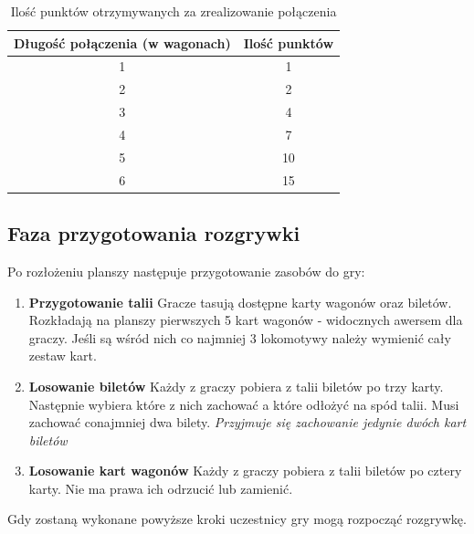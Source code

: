 \documentclass[12pt, oneside]{report}
\begin{document}
\begin{table}[h]
	\begin{center}
		\begin{tabular}{|c|c|} \hline
		\textbf{Długość połączenia} (w wagonach) & \textbf{Ilość punktów} \\ \hline
		1 & 1 \\ \hline
		2 & 2 \\ \hline
		3 & 4 \\ \hline
		4 & 7 \\ \hline
		5 & 10 \\ \hline
		6 & 15 \\ \hline
		\end{tabular}	
		\caption{Ilość punktów otrzymywanych za zrealizowanie połączenia}
		\label{table:points}
	\end{center}

\end{table}

\subsection{Faza przygotowania rozgrywki}
Po rozłożeniu planszy następuje przygotowanie zasobów do gry:
\begin{enumerate}
	\item \textbf{Przygotowanie talii}
	\subitem Gracze tasują dostępne karty wagonów oraz biletów. Rozkładają na planszy pierwszych 5 kart wagonów - widocznych awersem dla graczy. Jeśli są wśród nich co najmniej 3 lokomotywy należy wymienić cały zestaw kart.
	\item \textbf{Losowanie biletów}
	\subitem Każdy z graczy pobiera z talii biletów po trzy karty. Następnie wybiera które z nich zachować a które odłożyć na spód talii. Musi zachować conajmniej dwa bilety. \textit{Przyjmuje się zachowanie jedynie dwóch kart biletów}
	\item \textbf{Losowanie kart wagonów}
	\subitem Każdy z graczy pobiera z talii biletów po cztery karty. Nie ma prawa ich odrzucić lub zamienić.
\end{enumerate}
Gdy zostaną wykonane powyższe kroki uczestnicy gry mogą rozpocząć rozgrywkę. 
\end{document}
